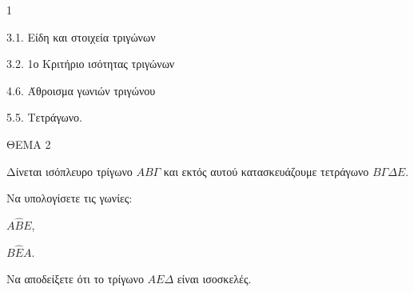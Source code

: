 \begin{ylh}{1}
    \item 3.1. Είδη και στοιχεία τριγώνων
    \item 3.2. 1ο Κριτήριο ισότητας τριγώνων
    \item 4.6. Άθροισμα γωνιών τριγώνου
    \item 5.5. Τετράγωνο.
\end{ylh}

ΘΕΜΑ 2

Δίνεται ισόπλευρο τρίγωνο $AB\Gamma$ και εκτός αυτού κατασκευάζουμε τετράγωνο $B\Gamma\Delta E$.

\begin{alist}
\item Να υπολογίσετε τις γωνίες:
\begin{alist}
\item $A\widehat{B}E$, 
\item $B\widehat{E}A$. 
\end{alist}
\item Να αποδείξετε ότι το τρίγωνο $AE\Delta$ είναι ισοσκελές. 

\begin{center}
\end{center}
\end{alist}
